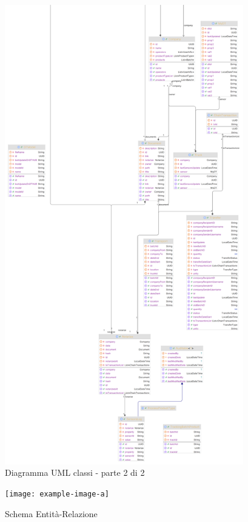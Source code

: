 \documentclass[a4paper,11pt]{article}
\begin{document}
\begin{figure}[H]
  \includegraphics[height=20cm]{img/model3_down.png}
  \caption{Diagramma UML classi - parte 2 di 2}
  \label{fig:schemaclassi2}
\end{figure}

\begin{figure}[H]
  \texttt{[image: example-image-a]}
  \caption{Schema Entità-Relazione}
  \label{fig:schemaer}
\end{figure}
\end{document}
